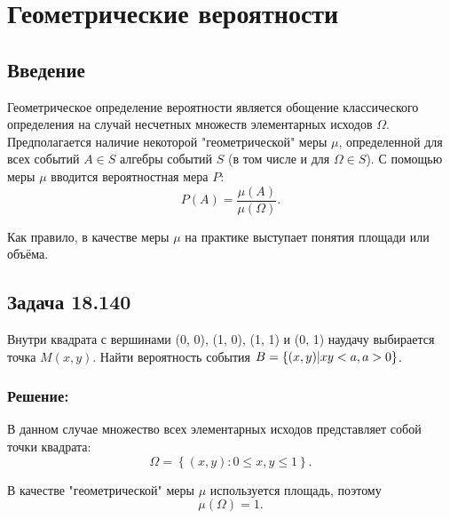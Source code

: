 \chapter{Геометрические вероятности}

\section*{Введение}

Геометрическое определение вероятности является обощение классического определения на случай несчетных множеств элементарных исходов $\Omega$. Предполагается наличие некоторой
"геометрической"{} меры $\mu$, определенной для всех событий $A \in S$ алгебры событий $S$ (в том числе и для $\Omega \in S$). С помощью меры $\mu$ вводится вероятностная мера
$P$:
\begin{equation}
    P \left ( A \right ) = \frac{\mu \left ( A \right )}{\mu \left ( \Omega \right )}.
\end{equation}

Как правило, в качестве меры $\mu$ на практике выступает понятия площади или объёма.

\section*{Задача 18.140}

Внутри квадрата с вершинами (0, 0), (1, 0), (1, 1) и (0, 1) наудачу выбирается точка $M(x,y)$. Найти вероятность события $B = \left \{ (x, y) | xy < a, a > 0 \right \}$.

\subsection*{Решение:}

В данном случае множество всех элементарных исходов представляет собой точки квадрата:
\begin{equation}
    \Omega = \left \{ (x, y) : 0 \le x, y \le 1 \right \}.
\end{equation}

В качестве "геометрической"{} меры $\mu$ используется площадь, поэтому
\begin{equation}
    \mu \left ( \Omega \right ) = 1.
\end{equation}

